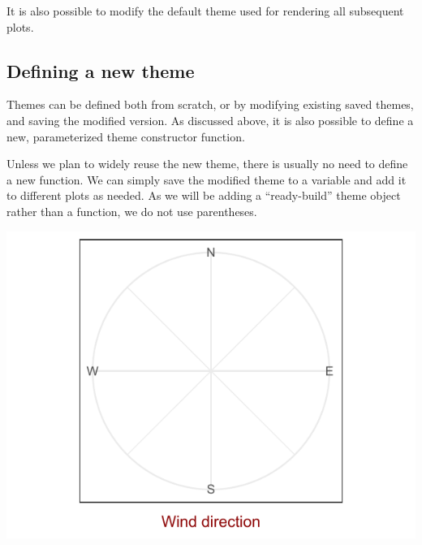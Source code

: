 \documentclass[krantz2]{krantz}\usepackage{knitr}
\begin{document}
It is also possible to modify the default theme used for rendering all subsequent plots.

\begin{knitrout}\footnotesize
{}\color{fgcolor}\begin{kframe}
\begin{alltt}
 \hlkwb{<-} \hlstd{(} \hlstd{=} \hlstd{(} \hlstd{=} \hlstd{))}
\end{alltt}
\end{kframe}
\end{knitrout}



\subsection{Defining a new theme}
Themes can be defined both from scratch, or by modifying existing saved themes, and saving the modified version. As discussed above, it is also possible to define a new, parameterized theme constructor function.

Unless we plan to widely reuse the new theme, there is usually no need to define a new function. We can simply save the modified theme to a variable and add it to different plots as needed. As we will be adding a ``ready-build'' theme object rather than a function, we do not use parentheses.

\begin{knitrout}\footnotesize
{}\color{fgcolor}\begin{kframe}
\begin{alltt}
 \hlkwb{<-} \hlstd{()} \hlopt{+} \hlstd{(} \hlstd{=} \hlstd{(} \hlstd{=} \hlstd{))}
 \hlopt{+} 
\end{alltt}
\end{kframe}

{\centering \includegraphics[width=.54\textwidth]{figure/pos-themes-21-1} 

}


\end{knitrout}
\end{document}

